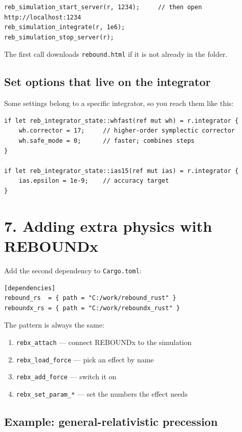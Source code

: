 \documentclass[11pt]{article}
\begin{document}
\begin{lstlisting}
reb_simulation_start_server(r, 1234);     // then open http://localhost:1234
reb_simulation_integrate(r, 1e6);
reb_simulation_stop_server(r);
\end{lstlisting}

The first call downloads \texttt{rebound.html} if it is not already in the folder.

\subsection{Set options that live on the integrator}

Some settings belong to a specific integrator, so you reach them like this:

\begin{lstlisting}
if let reb_integrator_state::whfast(ref mut wh) = r.integrator {
    wh.corrector = 17;     // higher-order symplectic corrector
    wh.safe_mode = 0;      // faster; combines steps
}

if let reb_integrator_state::ias15(ref mut ias) = r.integrator {
    ias.epsilon = 1e-9;    // accuracy target
}
\end{lstlisting}

\section{7. Adding extra physics with REBOUNDx}

Add the second dependency to \texttt{Cargo.toml}:

\begin{lstlisting}
[dependencies]
rebound_rs  = { path = "C:/work/rebound_rust" }
reboundx_rs = { path = "C:/work/reboundx_rust" }
\end{lstlisting}

The pattern is always the same:

\begin{enumerate}
\item \texttt{rebx\_attach} --- connect REBOUNDx to the simulation
\item \texttt{rebx\_load\_force} --- pick an effect by name
\item \texttt{rebx\_add\_force} --- switch it on
\item \texttt{rebx\_set\_param\_*} --- set the numbers the effect needs
\end{enumerate}

\subsection{Example: general-relativistic precession}
\end{document}
